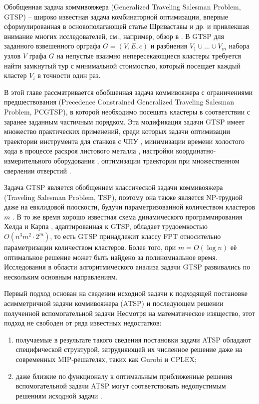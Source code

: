 
Обобщенная задача коммивояжера
(Generalized Traveling Salesman Problem, GTSP)
-- широко известная задача комбинаторной оптимизации,
впервые сформулированная в основополагающей статье Шриваставы и др.
\cite{SKGS1969}
и привлекшая внимание многих исследователей,
см., например, обзор в
\cite{GutinPunnen2007}.
В GTSP для заданного взвешенного орграфа
$ G = (V, E, c) $
и разбиения
$ V_1 \cup \ldots \cup V_m $
набора узлов $V$ графа $G$ на непустые взаимно непересекающиеся кластеры
требуется найти замкнутый тур с минимальной стоимостью,
который посещает каждый кластер
$V_i$
в точности один раз.

В этой главе рассматривается
обобщенная задача коммивояжера с ограничениями предшествования
(Precedence Constrained Generalized Traveling Salesman Problem, PCGTSP),
в которой необходимо посещать кластеры
в соответствии с заранее заданным частичным порядком.
Эта модификация задачи GTSP имеет множество практических применений, среди которых задачи
оптимизации траектории инструмента для станков с ЧПУ  \cite{CASTELINO2003173},
минимизации времени холостого хода в процессе раскроя листового металла \cite{bi:RoMa,Makarovskikh20181171},
настройки координатно-измерительного оборудования \cite{SALMAN2016138},
оптимизации траектории при множественном сверлении отверстий \cite{DEWIL2019}.

Задача GTSP является обобщением классической задачи коммивояжера
(Traveling Salesman Problem, TSP),
поэтому она также является NP-трудной
даже на евклидовой плоскости,
будучи параметризованной количеством кластеров
$m$
\cite{Papa77}.
В то же время хорошо известная схема динамического программирования Хелда и Карпа
\cite{HeldKarp1962},
адаптированная к GTSP,
обладает трудоемкостью
$ O (n ^ 3m ^ 2 \cdot 2 ^ m) $,
то есть
GTSP принадлежит классу FPT
относительно параметризации количеством кластеров.
Более того, при
$ m = O (\log n) $
её оптимальное решение может быть найдено за полиномиальное время.
Исследования в области алгоритмического анализа задачи GTSP
развивались по нескольким основным направлениям.

Первый подход основан на сведении исходной задачи
к подходящей постановке асимметричной задачи коммивояжера
(ATSP)
и последующем решении полученной вспомогательной задачи
\cite{LaporteSemet1999,NoonBean1993}
Несмотря на математическое изящество, этот подход не свободен от ряда известных недостатков:
\begin{enumerate}
  \item
  получаемые в результате такого сведения постановки задачи ATSP
  обладают специфической структурой,
  затрудняющей их численное решение даже на современных MIP-решателях,
  таких как Gurobi и CPLEX;
  \item
  даже близкие по функционалу к оптимальным
  приближенные решения вспомогательной задачи ATSP
  могут соответствовать недопустимым решениям исходной задачи
  \cite{KaraGut2012}.
\end{enumerate}


